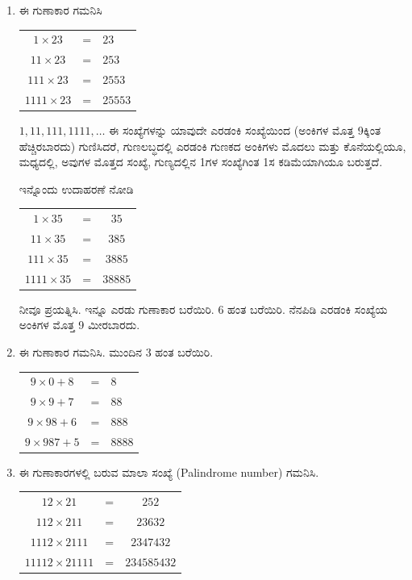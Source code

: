 \begin{enumerate}
\item ಈ ಗುಣಾಕಾರ ಗಮನಿಸಿ 

\begin{tabular}[t]{ccl}
$1\times 23$ & = & $23$\\
$11\times 23$ & = & $253$\\
$111\times 23$ & = & $2553$\\
$1111\times 23$ & = & $25553$
\end{tabular}

\vskip 0.2cm

$1, 11, 111, 1111, \ldots$ ಈ ಸಂಖ್ಯೆಗಳನ್ನು ಯಾವುದೇ ಎರಡಂಕಿ ಸಂಖ್ಯೆಯಿಂದ (ಅಂಕಿಗಳ ಮೊತ್ತ 9ಕ್ಕಿಂತ ಹೆಚ್ಚಿರಬಾರದು) ಗುಣಿಸಿದರೆ, ಗುಣಲಬ್ಧದಲ್ಲಿ ಎರಡಂಕಿ ಗುಣಕದ ಅಂಕಿಗಳು ಮೊದಲು ಮತ್ತು ಕೊನೆಯಲ್ಲಿಯೂ, ಮಧ್ಯದಲ್ಲಿ, ಅವುಗಳ ಮೊತ್ತದ ಸಂಖ್ಯೆ, ಗುಣ್ಯದಲ್ಲಿನ 1ಗಳ ಸಂಖ್ಯೆಗಿಂತ 1ಸ ಕಡಿಮೆಯಾಗಿಯೂ ಬರುತ್ತದೆ. 

\vskip 0.1cm

ಇನ್ನೊಂದು ಉದಾಹರಣೆ ನೋಡಿ 

\begin{tabular}[t]{ccc}
$1\times 35$ & = & $35$\\
$11\times 35$ & = & $385$\\
$111\times 35$ & = & $3885$\\
$1111\times 35$ & = & $38885$
\end{tabular}

\vskip 0.2cm

ನೀವೂ ಪ್ರಯತ್ನಿಸಿ. ಇನ್ನೂ ಎರಡು ಗುಣಾಕಾರ ಬರೆಯಿರಿ. 6 ಹಂತ ಬರೆಯಿರಿ. ನೆನಪಿಡಿ ಎರಡಂಕಿ ಸಂಖ್ಯೆಯ ಅಂಕಿಗಳ ಮೊತ್ತ  9 ಮೀರಬಾರದು. 

\item ಈ ಗುಣಾಕಾರ ಗಮನಿಸಿ. ಮುಂದಿನ 3 ಹಂತ ಬರೆಯಿರಿ. 

{\fontsize{11pt}{13pt}\selectfont
\begin{tabular}[t]{ccl}
$9\times 0 + 8$ & = & $8$\\
$9\times 9 + 7$ & = & $88$\\
$9\times 98 + 6$ & = & $888$\\
$9\times 987 + 5$ & = & $8888$\\
\end{tabular}}\relax

\item ಈ ಗುಣಾಕಾರಗಳಲ್ಲಿ ಬರುವ ಮಾಲಾ ಸಂಖ್ಯೆ (Palindrome number) ಗಮನಿಸಿ. 

{\fontsize{11pt}{13pt}\selectfont
\begin{tabular}[t]{ccc}
$12\times 21$ & = & $252$\\
$112\times 211$ & = & $23632$\\
$1112\times 2111$ & = & $2347432$\\
$11112\times 21111$ & = & $234585432$
\end{tabular}}\relax


\end{enumerate}

